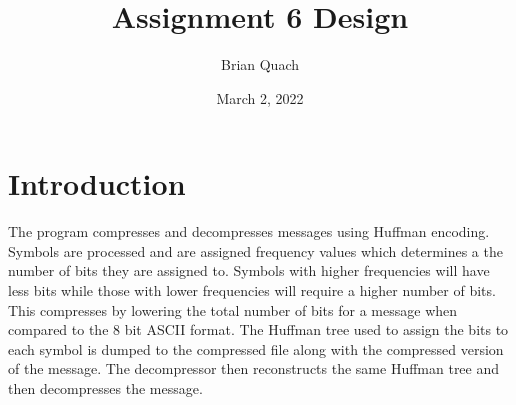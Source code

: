 \documentclass[11pt]{article}
\title{Assignment 6 Design}
\author{Brian Quach}
\date{March 2, 2022}
\begin{document}
 \maketitle

\section{Introduction}
The program compresses and decompresses messages using Huffman encoding. 
Symbols are processed and are assigned frequency values which determines a the number of bits they are assigned to. Symbols with higher frequencies will have less bits while those with lower frequencies will require a higher number of bits. This compresses by lowering the total number of bits for a message when compared to the 8 bit ASCII format. The Huffman tree used to assign the bits to each symbol is dumped to the compressed file along with the compressed version of the message. The decompressor then reconstructs the same Huffman tree and then decompresses the message.
\end{document}
